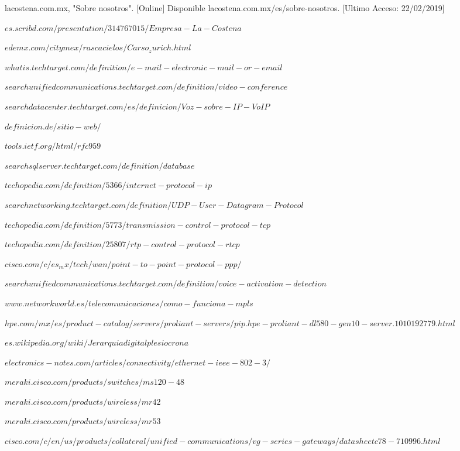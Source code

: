 \documentclass[12pt,letterpaper]{article}
\begin{document}
\newpage
\begin{thebibliography}{20}
    lacostena.com.mx, "Sobre nosotros". 
    [Online] Disponible lacostena.com.mx/es/sobre-nosotros.
    [Ultimo Acceso: 22/02/2019]

    $es.scribd.com/presentation/314767015/Empresa-La-Costena$

    $edemx.com/citymex/rascacielos/Carso_zurich.html$

    $whatis.techtarget.com/definition/e-mail-electronic-mail-or-email$
     
    $searchunifiedcommunications.techtarget.com/definition/video-conference$

    $searchdatacenter.techtarget.com/es/definicion/Voz-sobre-IP-VoIP$

    $definicion.de/sitio-web/$

    $tools.ietf.org/html/rfc959$

    $searchsqlserver.techtarget.com/definition/database$

    $techopedia.com/definition/5366/internet-protocol-ip$

    $searchnetworking.techtarget.com/definition/UDP-User-Datagram-Protocol$

    $techopedia.com/definition/5773/transmission-control-protocol-tcp$

    $techopedia.com/definition/25807/rtp-control-protocol-rtcp$

    $cisco.com/c/es_mx/tech/wan/point-to-point-protocol-ppp/$

    $searchunifiedcommunications.techtarget.com/definition/voice-activation-detection$

    $www.networkworld.es/telecomunicaciones/como-funciona-mpls$

    $hpe.com/mx/es/product-catalog/servers/proliant-servers/pip.hpe-proliant-dl580-gen10-server.1010192779.html$

    $es.wikipedia.org/wiki/Jerarquiadigitalplesiocrona$

    $electronics-notes.com/articles/connectivity/ethernet-ieee-802-3/$

    $meraki.cisco.com/products/switches/ms120-48$

    $meraki.cisco.com/products/wireless/mr42$

    $meraki.cisco.com/products/wireless/mr53$

    $cisco.com/c/en/us/products/collateral/unified-communications/vg-series-gateways/datasheetc78-710996.html$

\end{thebibliography}
\end{document}
